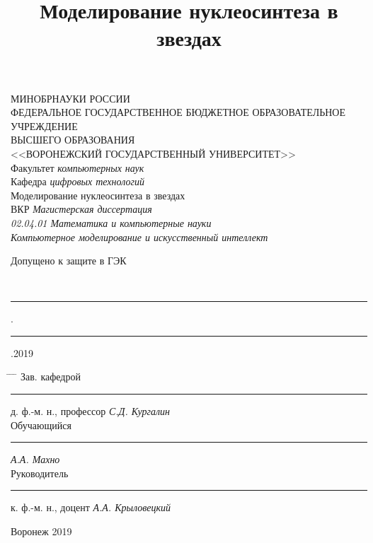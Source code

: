 \documentclass[14pt, a4paper]{article}
\numberwithin{figure}{section}
\numberwithin{equation}{section}
\begin{document}
	\thispagestyle{empty}
	\begin{spacing}{1.0}
		{
			\center
			{МИНОБРНАУКИ РОССИИ}\\
			{ФЕДЕРАЛЬНОЕ ГОСУДАРСТВЕННОЕ БЮДЖЕТНОЕ ОБРАЗОВАТЕЛЬНОЕ}\\
			{УЧРЕЖДЕНИЕ}\\
			{ВЫСШЕГО ОБРАЗОВАНИЯ}\\
			{<<ВОРОНЕЖСКИЙ ГОСУДАРСТВЕННЫЙ УНИВЕРСИТЕТ>>}\\
			
			\vspace{13mm}
			{\setlength{\parskip}{0pt}Факультет \textit{компьютерных наук}}\\
			\vspace{3mm}
			{\setlength{\parskip}{0pt}Кафедра \textit{цифровых технологий}}\\
			
			\vspace{32mm}
			{Моделирование нуклеосинтеза в звездах}\\
			
			\vspace{5mm}
			{{ВКР} \textit{Магистерская диссертация}}\\
			{\setlength{\parskip}{6pt}\textit{02.04.01 Математика и компьютерные науки}}\\
			{\setlength{\parskip}{6pt}\textit{Компьютерное моделирование и искусственный интеллект}}\\
			
			\vspace{20mm}
			\begin{flushleft}
				{Допущено к защите в ГЭК}{\ \ \rule[0mm]{5mm}{0,3mm}.\rule[0mm]{5mm}{0,3mm}.2019}
			\end{flushleft}
			\vspace{3mm}
			\begin{tabbing}
				\hspace*{4cm}\=\hspace*{4cm} \= \hspace*{5cm} \= \kill
				Зав. кафедрой\> \rule[0mm]{3.7cm}{0,3mm} \> {д. ф.-м. н., профессор} \> \textit{С.Д. Кургалин} \\[8mm]
				Обучающийся \> \rule[0mm]{3.7cm}{0,3mm} \> \> \textit{А.А. Махно} \\[8mm]
				Руководитель \> \rule[0mm]{3.7cm}{0,3mm} \> {к. ф.-м. н., доцент} \> \textit{А.А. Крыловецкий}
			\end{tabbing}
			
			\vspace{30mm}
			
			\centerline{Воронеж 2019}
		}
	\end{spacing}
	\clearpage
\title{Моделирование нуклеосинтеза в звездах}
\newpage
\end{document}
